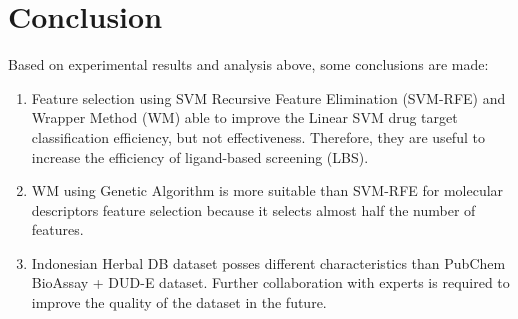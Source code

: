 \documentclass[conference]{IEEEtran}
\begin{document}
\section{Conclusion}

Based on experimental results and analysis above, some conclusions are made:

\begin{enumerate}
	\item Feature selection using SVM Recursive Feature Elimination (SVM-RFE) and Wrapper Method (WM) able to improve the Linear SVM drug target classification efficiency, but not effectiveness. Therefore, they are useful to increase the efficiency of ligand-based screening (LBS).
	\item WM using Genetic Algorithm is more suitable than SVM-RFE for molecular descriptors feature selection because it selects almost half the number of features.
	\item Indonesian Herbal DB dataset posses different characteristics than PubChem BioAssay + DUD-E dataset. Further collaboration with experts is required to improve the quality of the dataset in the future.
\end{enumerate}



\end{document}
